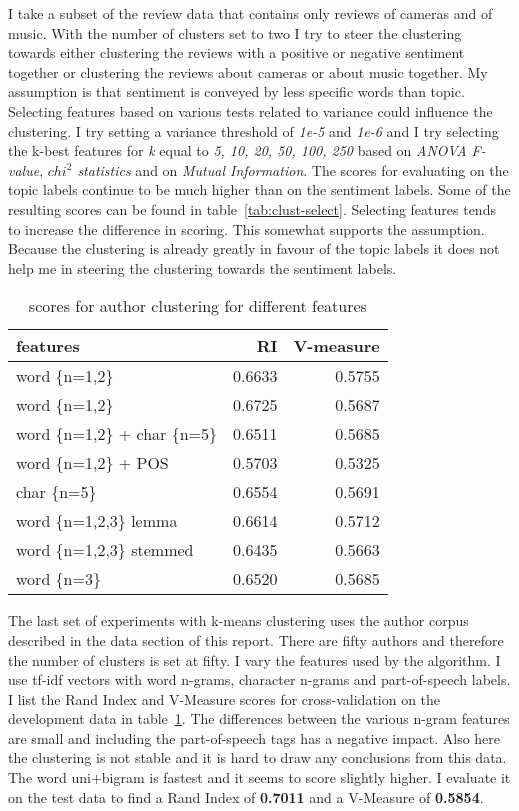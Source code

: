 \documentclass[11pt]{article}
\begin{document}
I take a subset of the review data that contains only reviews of cameras and of music. With the number of clusters set to two I try to steer the clustering towards either clustering the reviews with a positive or negative sentiment together or clustering the reviews about cameras or about music together. My assumption is that sentiment is conveyed by less specific words than topic. Selecting features based on various tests related to variance could influence the clustering. I try setting a variance threshold of \emph{1e-5} and \emph{1e-6} and I try selecting the k-best features for \emph{k} equal to \emph{5, 10, 20, 50, 100, 250} based on \emph{ANOVA F-value}, \emph{$chi^2$ statistics} and on \emph{Mutual Information}. The scores for evaluating on the topic labels continue to be much higher than on the sentiment labels. Some of the resulting scores can be found in table~\ref{tab:clust-select}. Selecting features tends to increase the difference in scoring. This somewhat supports the assumption. Because the clustering is already greatly in favour of the topic labels it does not help me in steering the clustering towards the sentiment labels.

\begin{table}[ht]\footnotesize
\centering
\caption{scores for author clustering for different features}
\label{tab:authors}
\begin{tabular}{ l r r }
features & RI & V-measure \\
\hline
word \{n=1,2\}            & 0.6633 & 0.5755 \\
word \{n=1,2\}            & 0.6725 & 0.5687 \\
word \{n=1,2\} + char \{n=5\} & 0.6511 & 0.5685 \\
word \{n=1,2\} + POS      & 0.5703 & 0.5325 \\
char \{n=5\}              & 0.6554 & 0.5691 \\
word \{n=1,2,3\} lemma    & 0.6614 & 0.5712 \\
word \{n=1,2,3\} stemmed  & 0.6435 & 0.5663 \\
word \{n=3\}              & 0.6520 & 0.5685 \\
\end{tabular}
\end{table}

The last set of experiments with k-means clustering uses the author corpus described in the data section of this report. There are fifty authors and therefore the number of clusters is set at fifty. I vary the features used by the algorithm. I use tf-idf vectors with word n-grams, character n-grams and part-of-speech labels. I list the Rand Index and V-Measure scores for cross-validation on the development data in table~\ref{tab:authors}. The differences between the various n-gram features are small and including the part-of-speech tags has a negative impact. Also here the clustering is not stable and it is hard to draw any conclusions from this data. The word uni+bigram is fastest and it seems to score slightly higher. I evaluate it on the test data to find a Rand Index of \textbf{0.7011} and a V-Measure of \textbf{0.5854}.
\end{document}
